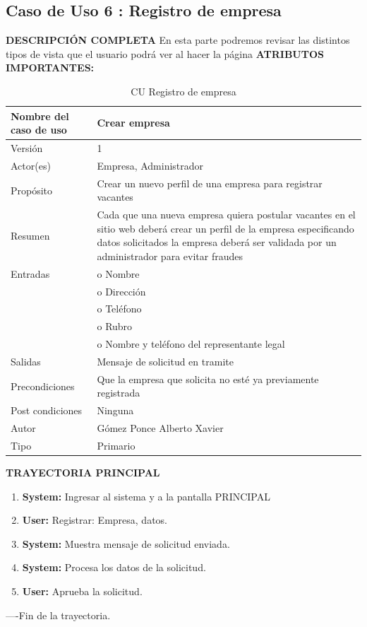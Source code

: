 \newpage			
\subsection{Caso de Uso 	6	: Registro de empresa	}
		\textbf{DESCRIPCIÓN COMPLETA}	
		\newline 	
		En esta parte podremos revisar las distintos tipos de vista que el usuario podrá ver al hacer la página 	
\newline	\newline	\textbf{ATRIBUTOS IMPORTANTES:}	

\begin{table}[h]			
        \begin{center}			
\begin{tabular}{|l|p{11cm}|} \hline			
Nombre del caso de uso	&	Crear empresa	\\ \hline
Versión	&	1	\\ \hline
Actor(es)	&	Empresa, Administrador	\\ \hline
Propósito	&	Crear un nuevo perfil de una empresa para registrar vacantes	\\ \hline
Resumen	&	Cada que una nueva empresa quiera postular vacantes en el sitio web deberá crear un perfil de la empresa especificando datos solicitados la empresa deberá ser validada por un administrador para evitar fraudes	\\ \hline
Entradas	&	o Nombre	\\ 
&		o Dirección	\\
&		o Teléfono	\\
&		o Rubro	\\
&		o Nombre y teléfono del representante legal	\\\hline
Salidas	&	Mensaje de solicitud en tramite	\\ \hline
Precondiciones	&	Que la empresa que solicita no esté ya previamente registrada	\\ \hline
Post condiciones	&	Ninguna	\\ \hline
Autor	&	Gómez Ponce Alberto Xavier	\\ \hline
Tipo	&	Primario	\\ \hline
\end{tabular}			
        \caption	{	CU Registro de empresa	}
        \label	{tabla	6	}
        \end{center}			
\end{table}			

\textbf{TRAYECTORIA PRINCIPAL}			
\begin{enumerate}			
\item \textbf{	System: 	}	Ingresar al sistema y a la pantalla PRINCIPAL
\item \textbf{	User: 	}	Registrar: Empresa, datos. 
\item \textbf{	System: 	}	Muestra mensaje de solicitud enviada.
\item \textbf{	System: 	}	Procesa los datos de la solicitud.
\item \textbf{	User: 	}	Aprueba la solicitud.
			
			
			
			
\end{enumerate}			
----Fin de la trayectoria.			




